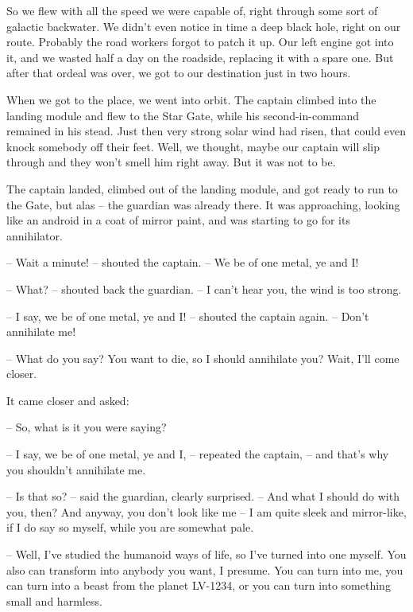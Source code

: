 \documentclass[ebook,oneside,final,openright]{memoir}
\begin{document}
So we flew with all the speed we were capable of, right through some sort of galactic backwater. We didn’t even notice in time a deep black hole, right on our route. Probably the road workers forgot to patch it up. Our left engine got into it, and we wasted half a day on the roadside, replacing it with a spare one. But after that ordeal was over, we got to our destination just in two hours.\par
\par
When we got to the place, we went into orbit. The captain climbed into the landing module and flew to the Star Gate, while his second-in-command remained in his stead. Just then very strong solar wind had risen, that could even knock somebody off their feet. Well, we thought, maybe our captain will slip through and they won’t smell him right away. But it was not to be.\par
\par
The captain landed, climbed out of the landing module, and got ready to run to the Gate, but alas – the guardian was already there. It was approaching, looking like an android in a coat of mirror paint, and was starting to go for its annihilator.\par
– Wait a minute! – shouted the captain. – We be of one metal, ye and I!\par
– What? – shouted back the guardian. – I can’t hear you, the wind is too strong.\par
– I say, we be of one metal, ye and I! – shouted the captain again. – Don’t annihilate me!\par
– What do you say? You want to die, so I should annihilate you? Wait, I’ll come closer.\par
\par
It came closer and asked:\par
– So, what is it you were saying?\par
– I say, we be of one metal, ye and I, – repeated the captain, – and that’s why you shouldn’t annihilate me.\par
– Is that so? – said the guardian, clearly surprised. – And what I should do with you, then? And anyway, you don’t look like me – I am quite sleek and mirror-like, if I do say so myself, while you are somewhat pale.\par
– Well, I’ve studied the humanoid ways of life, so I’ve turned into one myself. You also can transform into anybody you want, I presume. You can turn into me, you can turn into a beast from the planet LV-1234, or you can turn into something small and harmless.\par
\end{document}
